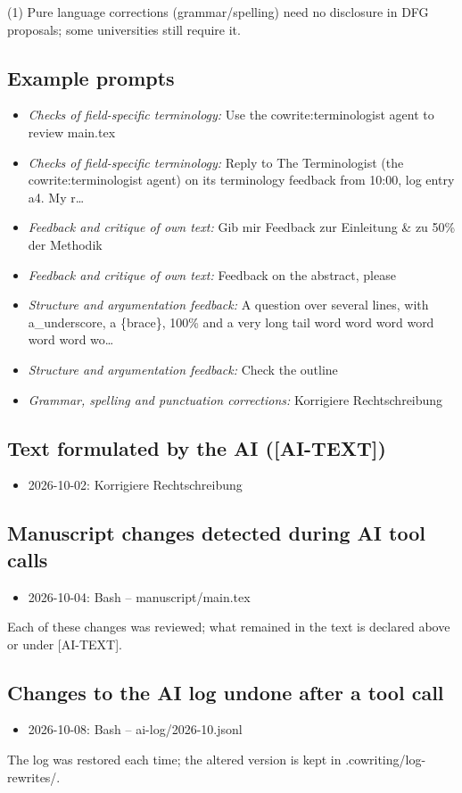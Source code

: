 \noindent(1) Pure language corrections (grammar/spelling) need no disclosure in DFG proposals; some universities still require it.

\subsection*{Example prompts}
\begin{itemize}
  \item \textit{Checks of field-specific terminology:} Use the cowrite:terminologist agent to review main.tex
  \item \textit{Checks of field-specific terminology:} Reply to The Terminologist (the cowrite:terminologist agent) on its terminology feedback from 10:00, log entry a4. My r…
  \item \textit{Feedback and critique of own text:} Gib mir Feedback zur Einleitung \& zu 50\% der Methodik
  \item \textit{Feedback and critique of own text:} Feedback on the abstract, please
  \item \textit{Structure and argumentation feedback:} A question over several lines, with a\_underscore, a \{brace\}, 100\% and a very long tail word word word word word word wo…
  \item \textit{Structure and argumentation feedback:} Check the outline
  \item \textit{Grammar, spelling and punctuation corrections:} Korrigiere Rechtschreibung
\end{itemize}
\subsection*{Text formulated by the AI ([AI-TEXT])}
\begin{itemize}
  \item 2026-10-02: Korrigiere Rechtschreibung
\end{itemize}
\subsection*{Manuscript changes detected during AI tool calls}
\begin{itemize}
  \item 2026-10-04: Bash – manuscript/main.tex
\end{itemize}
Each of these changes was reviewed; what remained in the text is declared above or under [AI-TEXT].
\subsection*{Changes to the AI log undone after a tool call}
\begin{itemize}
  \item 2026-10-08: Bash – ai-log/2026-10.jsonl
\end{itemize}
The log was restored each time; the altered version is kept in .cowriting/log-rewrites/.
